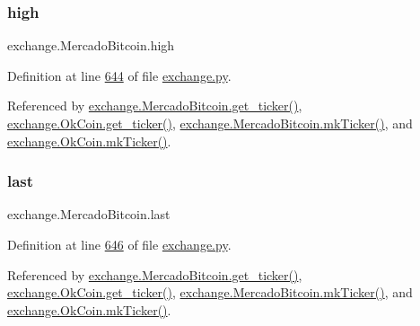 \mbox{\label{classexchange_1_1_mercado_bitcoin_a0b9c2d465601a48e3b8838354e931c39}} 
\subsubsection{\texorpdfstring{high}{high}}
{\footnotesize\ttfamily exchange.\+Mercado\+Bitcoin.\+high}



Definition at line \hyperlink{exchange_8py_source_l00644}{644} of file \hyperlink{exchange_8py_source}{exchange.\+py}.



Referenced by \hyperlink{exchange_8py_source_l00651}{exchange.\+Mercado\+Bitcoin.\+get\+\_\+ticker()}, \hyperlink{exchange_8py_source_l00716}{exchange.\+Ok\+Coin.\+get\+\_\+ticker()}, \hyperlink{exchange_8py_source_l00665}{exchange.\+Mercado\+Bitcoin.\+mk\+Ticker()}, and \hyperlink{exchange_8py_source_l00730}{exchange.\+Ok\+Coin.\+mk\+Ticker()}.

\mbox{\label{classexchange_1_1_mercado_bitcoin_a5f2759cd17d5dd36bc813c815543f3cc}} 
\subsubsection{\texorpdfstring{last}{last}}
{\footnotesize\ttfamily exchange.\+Mercado\+Bitcoin.\+last}



Definition at line \hyperlink{exchange_8py_source_l00646}{646} of file \hyperlink{exchange_8py_source}{exchange.\+py}.



Referenced by \hyperlink{exchange_8py_source_l00651}{exchange.\+Mercado\+Bitcoin.\+get\+\_\+ticker()}, \hyperlink{exchange_8py_source_l00716}{exchange.\+Ok\+Coin.\+get\+\_\+ticker()}, \hyperlink{exchange_8py_source_l00665}{exchange.\+Mercado\+Bitcoin.\+mk\+Ticker()}, and \hyperlink{exchange_8py_source_l00730}{exchange.\+Ok\+Coin.\+mk\+Ticker()}.

\mbox{\label{classexchange_1_1_mercado_bitcoin_aaa3aae824bfc5ba3b7dc5252e9554713}} 
